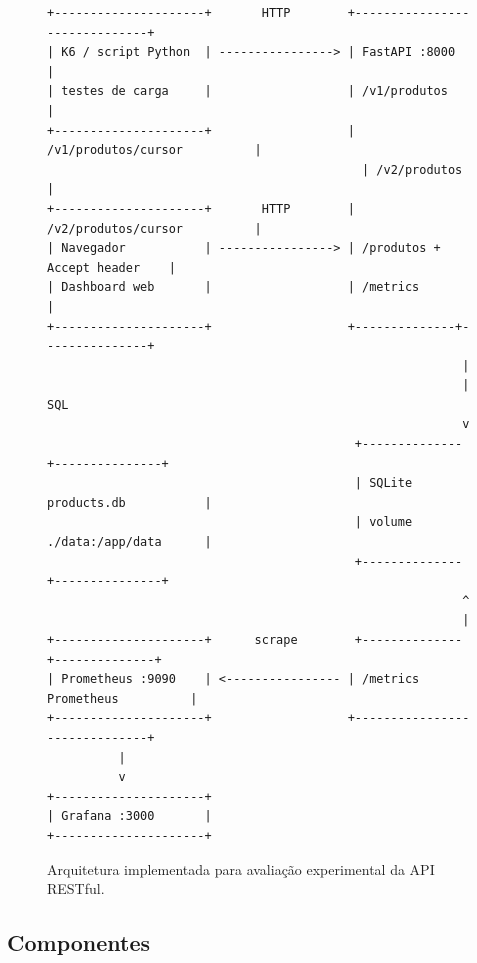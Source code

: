 \documentclass[journal]{IEEEtran}
\begin{document}
\begin{figure}[htbp]
\centering
\begin{minipage}{0.92\textwidth}
\footnotesize
\begin{verbatim}
+---------------------+       HTTP        +------------------------------+
| K6 / script Python  | ----------------> | FastAPI :8000                |
| testes de carga     |                   | /v1/produtos                 |
+---------------------+                   | /v1/produtos/cursor          |
                                            | /v2/produtos               |
+---------------------+       HTTP        | /v2/produtos/cursor          |
| Navegador           | ----------------> | /produtos + Accept header    |
| Dashboard web       |                   | /metrics                     |
+---------------------+                   +--------------+---------------+
                                                          |
                                                          | SQL
                                                          v
                                           +--------------+---------------+
                                           | SQLite products.db           |
                                           | volume ./data:/app/data      |
                                           +--------------+---------------+
                                                          ^
                                                          |
+---------------------+      scrape        +--------------+--------------+
| Prometheus :9090    | <---------------- | /metrics Prometheus          |
+---------------------+                   +------------------------------+
          |
          v
+---------------------+
| Grafana :3000       |
+---------------------+
\end{verbatim}
\end{minipage}
\caption{Arquitetura implementada para avaliação experimental da API RESTful.}
\label{fig:arquitetura_textual}
\end{figure}

\subsection{Componentes}
\end{document}
